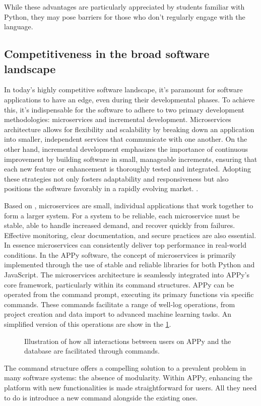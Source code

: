 \documentclass[10pt,twocolumn,twoside]{article}
\begin{document}
While these advantages are particularly appreciated by students familiar with Python, they may pose barriers for those who don't regularly engage with the language.

\subsection{Competitiveness in the broad software landscape}

In today's highly competitive software landscape, it's paramount for software applications to have an edge, even during their developmental phases. To achieve this, it's indispensable for the software to adhere to two primary development methodologies: microservices and incremental development. Microservices architecture allows for flexibility and scalability by breaking down an application into smaller, independent services that communicate with one another. On the other hand, incremental development emphasizes the importance of continuous improvement by building software in small, manageable increments, ensuring that each new feature or enhancement is thoroughly tested and integrated. Adopting these strategies not only fosters adaptability and responsiveness but also positions the software favorably in a rapidly evolving market. \citep{fowler2016, cohn2005, rolakuchta2015}.

Based on \cite{fowler2016}, microservices are small, individual applications that work together to form a larger system. For a system to be reliable, each microservice must be stable, able to handle increased demand, and recover quickly from failures. Effective monitoring, clear documentation, and secure practices are also essential. In essence microservices can consistently deliver top performance in real-world conditions. In the APPy software, the concept of microservices is primarily implemented through the use of stable and reliable libraries for both Python and JavaScript. The microservices architecture is seamlessly integrated into APPy's core framework, particularly within its command structures. APPy can be operated from the command prompt, executing its primary functions via specific commands. These commands facilitate a range of well-log operations, from project creation and data import to advanced machine learning tasks. An simplified version of this operations are show in the \cref{fig:command_s}.

\begin{figure}[H]
	\centering
	\caption{Illustration of how all interactions between users on APPy and the database are facilitated through commands.}
	\label{fig:command_s}
\end{figure}
The command structure offers a compelling solution to a prevalent problem in many software systems: the absence of modularity. Within APPy, enhancing the platform with new functionalities is made straightforward for users. All they need to do is introduce a new command alongside the existing ones.
\end{document}
